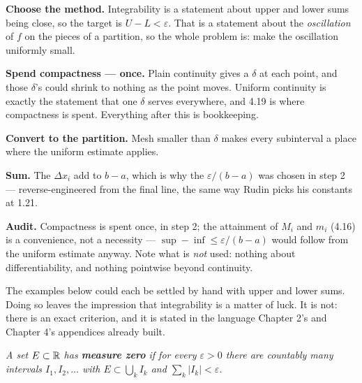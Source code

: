\begin{proofwalk}
  \item \textbf{Choose the method.} Integrability is a statement about upper
        and lower sums being close, so the target is $U-L<\varepsilon$. That
        is a statement about the \emph{oscillation} of $f$ on the pieces of a
        partition, so the whole problem is: make the oscillation uniformly
        small.
  \item \textbf{Spend compactness --- once.} Plain continuity gives a
        $\delta$ at each point, and those $\delta$'s could shrink to nothing
        as the point moves. Uniform continuity is exactly the statement that
        one $\delta$ serves everywhere, and 4.19 is where compactness is
        spent. Everything after this is bookkeeping.
  \item \textbf{Convert to the partition.} Mesh smaller than $\delta$ makes
        every subinterval a place where the uniform estimate applies.
  \item \textbf{Sum.} The $\Delta x_i$ add to $b-a$, which is why the
        $\varepsilon/(b-a)$ was chosen in step 2 --- reverse-engineered from
        the final line, the same way Rudin picks his constants at 1.21.
  \item \textbf{Audit.} Compactness is spent once, in step 2; the
        attainment of $M_i$ and $m_i$ (4.16) is a convenience, not a
        necessity --- $\sup - \inf \le \varepsilon/(b-a)$ would follow from
        the uniform estimate anyway. Note what is \emph{not} used: nothing
        about differentiability, and nothing pointwise beyond continuity.
\end{proofwalk}


\begin{signpost}
The examples below could each be settled by hand with upper and lower sums.
Doing so leaves the impression that integrability is a matter of luck. It is
not: there is an exact criterion, and it is stated in the language Chapter
2's and Chapter 4's appendices already built.
\end{signpost}

\emph{A set $E \subset \mathbb{R}$ has \textbf{measure zero} if for every
$\varepsilon>0$ there are countably many intervals $I_1,I_2,\dots$ with
$E \subset \bigcup_k I_k$ and $\sum_k |I_k| < \varepsilon$.}

